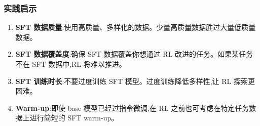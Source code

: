 \subsubsection*{实践启示}
\label{practical-implications}

\begin{enumerate}
  \item \textbf{SFT 数据质量}:使用高质量、多样化的数据。少量高质量数据胜过大量低质量数据。
  \item \textbf{SFT 数据覆盖度}:确保 SFT 数据覆盖你想通过 RL 改进的任务。如果某任务不在 SFT 数据中,RL 将难以推进。
  \item \textbf{SFT 训练时长}:不要过度训练 SFT 模型。过度训练降低多样性,让 RL 探索更困难。
  \item \textbf{Warm-up}:即使 base 模型已经过指令微调,在 RL 之前也可考虑在特定任务数据上进行简短的 SFT warm-up。
\end{enumerate}

